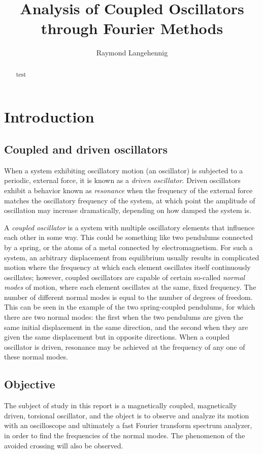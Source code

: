\documentclass{article}
\title{Analysis of Coupled Oscillators through Fourier Methods}
\author{Raymond Langehennig}
\begin{document}
\maketitle

\begin{abstract}
  test
\end{abstract}

\section{Introduction}

\subsection{Coupled and driven oscillators}
When a system exhibiting oscillatory motion (an oscillator) is subjected to a periodic, external force, it is known as a \emph{driven oscillator}. Driven oscillators exhibit a behavior known as \emph{resonance} when the frequency of the external force matches the oscillatory frequency of the system, at which point the amplitude of oscillation may increase dramatically, depending on how damped the system is.

A \emph{coupled oscillator} is a system with multiple oscillatory elements that influence each other in some way. This could be something like two pendulums connected by a spring, or the atoms of a metal connected by electromagnetism. For such a system, an arbitrary displacement from equilibrium usually results in complicated motion where the frequency at which each element oscillates itself continuously oscillates; however, coupled oscillators are capable of certain so-called \emph{normal modes} of motion, where each element oscillates at the same, fixed frequency. The number of different normal modes is equal to the number of degrees of freedom. This can be seen in the example of the two spring-coupled pendulums, for which there are two normal modes: the first when the two pendulums are given the same initial displacement in the same direction, and the second when they are given the same displacement but in opposite directions. When a coupled oscillator is driven, resonance may be achieved at the frequency of any one of these normal modes.

\subsection{Objective}
The subject of study in this report is a magnetically coupled, magnetically driven, torsional oscillator, and the object is to observe and analyze its motion with an oscilloscope and ultimately a fast Fourier transform spectrum analyzer, in order to find the frequencies of the normal modes. The phenomenon of the avoided crossing will also be observed.
\end{document}
